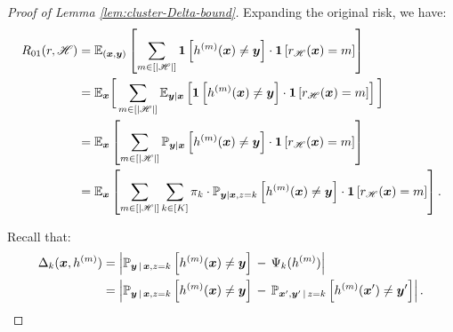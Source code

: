 \begin{proof}[Proof of Lemma \ref{lem:cluster-Delta-bound}]
Expanding the original risk, we have:
\begin{align}
R_{01}(r,\mathscr{H})
& =\mathbb{E}_{(\boldsymbol{x}, \boldsymbol{y})}\left[\sum_{m\in[|\mathscr{H}|]}\bm{1}\left[h^{(m)}(\boldsymbol{x})\neq\boldsymbol{y}\right]\cdot\bm{1}\left[r_{\mathscr{H}}(\boldsymbol{x})=m\right]\right]
\nonumber
\\
& = \mathbb{E}_{\boldsymbol{x}}\bigg[\sum_{m\in[|\mathscr{H}|]}\mathbb{E}_{\boldsymbol{y}|\boldsymbol{x}}\left[\bm{1}\left[h^{(m)}(\boldsymbol{x})\neq\boldsymbol{y}\right]\cdot\bm{1}\left[r_{\mathscr{H}}(\boldsymbol{x})=m\right]\right]\bigg]
\nonumber
\\
& = \mathbb{E}_{\boldsymbol{x}}\left[\sum_{m\in[|\mathscr{H}|]}\mathbb{P}_{\boldsymbol{y}|\boldsymbol{x}}\left[h^{(m)}(\boldsymbol{x})\neq\boldsymbol{y}\right]\cdot\bm{1}\left[r_{\mathscr{H}}(\boldsymbol{x})=m\right]\right]
\nonumber
\\
& = \mathbb{E}_{\boldsymbol{x}}\left[\sum_{m\in[|\mathscr{H}|]}\sum_{k \in [K]}\pi_k \cdot \mathbb{P}_{\boldsymbol{y}|\boldsymbol{x}, z=k}\left[h^{(m)}(\boldsymbol{x})\neq\boldsymbol{y}\right]\cdot\bm{1}\left[r_{\mathscr{H}}(\boldsymbol{x})=m\right]\right].
\label{eq:R01-expand}
\end{align}

Recall that:
\begin{align*}
\Delta_{k}(\boldsymbol{x}, h^{(m)}) &= 
\left|\mathbb{P}_{\boldsymbol{y}\,|\,\boldsymbol{x}, z=k} \left[h^{(m)}(\boldsymbol{x})\neq\boldsymbol{y} \right] \,-\, \Psi_{k}(h^{(m)})\right|
\\
&=\left|\mathbb{P}_{\boldsymbol{y}\,|\,\boldsymbol{x}, z=k} \left[h^{(m)}(\boldsymbol{x})\neq\boldsymbol{y} \right] \,-\, \mathbb{P}_{\boldsymbol{x}', \boldsymbol{y}'\,|\,z=k}\left[h^{(m)}(\boldsymbol{x}')\neq\boldsymbol{y}'\right] \right|.
\end{align*}


\end{proof}
